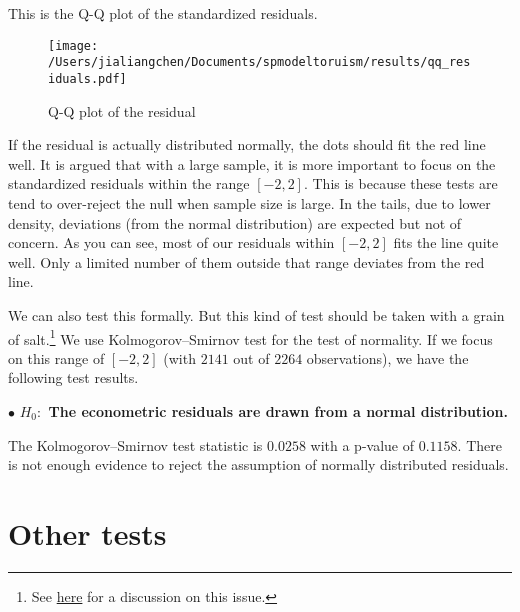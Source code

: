 \documentclass[11pt,a4paper]{amsart}
\theoremstyle{plain}
\theoremstyle{definition}
\begin{document}
This is the Q-Q plot of the standardized residuals.
\begin{figure}[hbt]
	{\centering \texttt{[image: /Users/jialiangchen/Documents/spmodeltoruism/results/qq\_residuals.pdf]}}
	\caption{Q-Q plot of the residual}\label{F:qq_residuals}
\end{figure}

If the residual is actually distributed normally, the dots should fit the red line well. It is argued that with a large sample, it is more important to focus on the standardized residuals within the range $[-2, 2]$. This is because these tests are tend to over-reject the null when  sample size is large.  In the tails, due to lower density, deviations (from the normal distribution) are expected but not of concern. As you can see, most of our residuals within $[-2, 2]$ fits the line quite well. Only a limited number of them outside that range deviates from the red line.

We can also test this formally. But this kind of test should be taken with a grain of salt.\footnote{See \href{https://stats.stackexchange.com/questions/2492/is-normality-testing-essentially-useless}{here} for a discussion on this issue.} We use Kolmogorov–Smirnov test for the test of normality. If we focus on this range of $[-2, 2]$ (with $2141$ out of $2264$ observations), we have the following test results.

$\bullet$ \textbf{$H_{0}:$ The econometric residuals are drawn from a normal distribution.} 

The Kolmogorov–Smirnov test statistic is  $0.0258$ with a p-value of $0.1158$. There is not enough evidence to reject the assumption of normally distributed residuals. 



\section{Other tests}

\printbibliography
\end{document}

